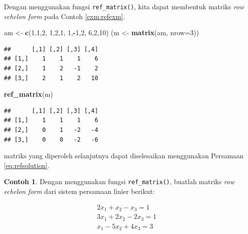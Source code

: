 \documentclass[
]{book}
\newenvironment{Shaded}{\begin{snugshade}}{\end{snugshade}}
\newcommand{\AttributeTok}[1]{\textcolor[rgb]{0.13,0.29,0.53}{#1}}
\newcommand{\DecValTok}[1]{\textcolor[rgb]{0.00,0.00,0.81}{#1}}
\newcommand{\FunctionTok}[1]{\textcolor[rgb]{0.13,0.29,0.53}{\textbf{#1}}}
\newcommand{\NormalTok}[1]{#1}
\newcommand{\OtherTok}[1]{\textcolor[rgb]{0.56,0.35,0.01}{#1}}
\newcommand{\SpecialCharTok}[1]{\textcolor[rgb]{0.81,0.36,0.00}{\textbf{#1}}}
\theoremstyle{definition}
\theoremstyle{definition}
\newtheorem{example}{Contoh}[chapter]
\theoremstyle{definition}
\theoremstyle{definition}
\theoremstyle{remark}
\begin{document}
Dengan menggunakan fungsi \texttt{ref\_matrix()}, kita dapat membentuk matriks \emph{row echelon form} pada Contoh \ref{exm:refexm}.

\begin{Shaded}
\begin{Highlighting}[]
\NormalTok{am }\OtherTok{\textless{}{-}} \FunctionTok{c}\NormalTok{(}\DecValTok{1}\NormalTok{,}\DecValTok{1}\NormalTok{,}\DecValTok{2}\NormalTok{,}
        \DecValTok{1}\NormalTok{,}\DecValTok{2}\NormalTok{,}\DecValTok{1}\NormalTok{,}
        \DecValTok{1}\NormalTok{,}\SpecialCharTok{{-}}\DecValTok{1}\NormalTok{,}\DecValTok{2}\NormalTok{,}
        \DecValTok{6}\NormalTok{,}\DecValTok{2}\NormalTok{,}\DecValTok{10}\NormalTok{)}
\NormalTok{(m }\OtherTok{\textless{}{-}} \FunctionTok{matrix}\NormalTok{(am, }\AttributeTok{nrow=}\DecValTok{3}\NormalTok{))}
\end{Highlighting}
\end{Shaded}

\begin{verbatim}
##      [,1] [,2] [,3] [,4]
## [1,]    1    1    1    6
## [2,]    1    2   -1    2
## [3,]    2    1    2   10
\end{verbatim}

\begin{Shaded}
\begin{Highlighting}[]
\FunctionTok{ref\_matrix}\NormalTok{(m)}
\end{Highlighting}
\end{Shaded}

\begin{verbatim}
##      [,1] [,2] [,3] [,4]
## [1,]    1    1    1    6
## [2,]    0    1   -2   -4
## [3,]    0    0   -2   -6
\end{verbatim}

matriks yang diperoleh selanjutnya dapat diselesaikan menggunakan Persamaan \eqref{eq:refsolution}.

\begin{example}
\protect\hypertarget{exm:refexm2}{}\label{exm:refexm2}Dengan menggunakan fungsi \texttt{ref\_matrix()}, buatlah matriks \emph{row echelon form} dari sistem persamaan linier berikut:
\end{example}

\[
\begin{matrix}
  2x_1+x_2-x_3=1 \\
  3x_1+2x_2-2x_3=1 \\
  x_1-5x_2+4x_3=3 \\
\end{matrix}
\]
\end{document}

